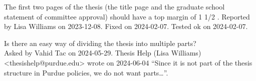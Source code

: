 The first two pages of the thesis
(the title page
and the graduate school statement of committee approval)
should have a top margin of 1 1/2 \si{\in}.
{\small
  Reported by Lisa Williams on 2023-12-08.
  Fixed on 2024-02-07.
  Tested ok on 2024-02-07.%
}

Is there an easy way of dividing the thesis into multiple parts?\\
{\small
  Asked by Vahid Tac on 2024-05-29.
  Thesis Help (Lisa Williams) <thesishelp@purdue.edu>
  wrote on 2024-06-04
  ``Since it is not part of the thesis structure in Purdue policies,
  we do not want parts\ldots''.%
}


